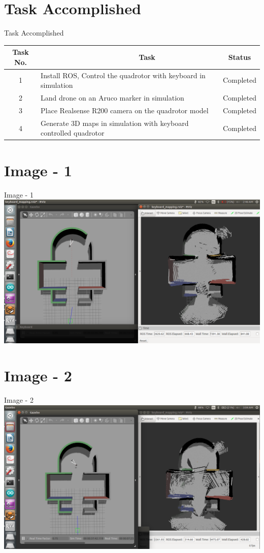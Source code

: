 \documentclass[10pt, a4paper]{beamer}
\begin{document}
\section{Task Accomplished}
\begin{frame}{Task Accomplished}
\begin{tabular}{| c | p{6.5cm} | c | }
\hline
Task No. & ~~~~~~~~~~~~~~~~~~~~~~~~Task & Status\\
\hline
  1 & Install ROS, Control the quadrotor with keyboard in simulation & Completed\\
\hline
2 & Land drone on an Aruco marker in simulation & Completed\\
\hline
3 & Place Realsense R200 camera on the quadrotor model & Completed\\
\hline
4 & Generate 3D maps in simulation with keyboard controlled quadrotor & Completed\\
\hline
\end{tabular}
\end{frame}

\section{Image - 1}
\begin{frame}{Image  - 1}
\includegraphics[scale = 0.2]{1.png}
\end{frame}

\section{Image - 2}
\begin{frame}{Image  - 2}
\includegraphics[scale = 0.2]{2.png}
\end{frame}
\end{document}
